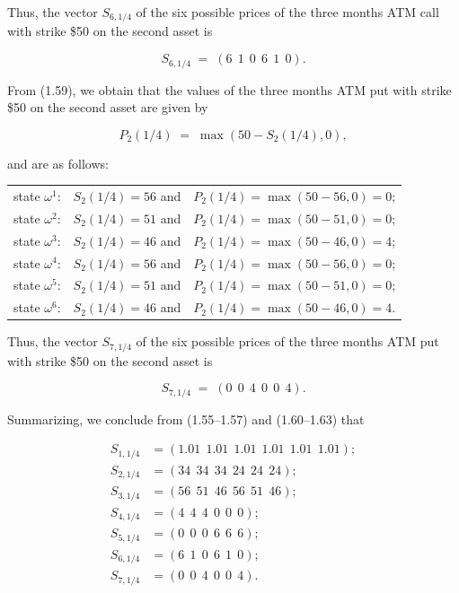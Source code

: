 Thus, the vector $S_{6,1/4}$ of the six possible prices of the three months
ATM call with strike \$50 on the second asset is

\begin{equation}
S_{6,1/4} \;=\; (6\ \ 1\ \ 0\ \ 6\ \ 1\ \ 0).
\end{equation}

From (1.59), we obtain that the values of the three months ATM put with
strike \$50 on the second asset are given by

\[
P_2(1/4) \;=\; \max(50-S_2(1/4),0),
\]

and are as follows:

\begin{center}
\begin{tabular}{lll}
state $\omega^1$: & $S_2(1/4)=56$ and & $P_2(1/4)=\max(50-56,0)=0$; \\
state $\omega^2$: & $S_2(1/4)=51$ and & $P_2(1/4)=\max(50-51,0)=0$; \\
state $\omega^3$: & $S_2(1/4)=46$ and & $P_2(1/4)=\max(50-46,0)=4$; \\
state $\omega^4$: & $S_2(1/4)=56$ and & $P_2(1/4)=\max(50-56,0)=0$; \\
state $\omega^5$: & $S_2(1/4)=51$ and & $P_2(1/4)=\max(50-51,0)=0$; \\
state $\omega^6$: & $S_2(1/4)=46$ and & $P_2(1/4)=\max(50-46,0)=4$. \\
\end{tabular}
\end{center}

Thus, the vector $S_{7,1/4}$ of the six possible prices of the three months
ATM put with strike \$50 on the second asset is

\begin{equation}
S_{7,1/4} \;=\; (0\ \ 0\ \ 4\ \ 0\ \ 0\ \ 4).
\end{equation}

Summarizing, we conclude from (1.55--1.57) and (1.60--1.63) that

\begin{align*}
S_{1,1/4} &= (1.01\ \ 1.01\ \ 1.01\ \ 1.01\ \ 1.01\ \ 1.01); \\
S_{2,1/4} &= (34\ \ 34\ \ 34\ \ 24\ \ 24\ \ 24); \\
S_{3,1/4} &= (56\ \ 51\ \ 46\ \ 56\ \ 51\ \ 46); \\
S_{4,1/4} &= (4\ \ 4\ \ 4\ \ 0\ \ 0\ \ 0); \\
S_{5,1/4} &= (0\ \ 0\ \ 0\ \ 6\ \ 6\ \ 6); \\
S_{6,1/4} &= (6\ \ 1\ \ 0\ \ 6\ \ 1\ \ 0); \\
S_{7,1/4} &= (0\ \ 0\ \ 4\ \ 0\ \ 0\ \ 4).
\end{align*}

